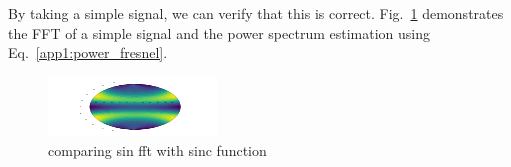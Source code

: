 By taking a simple signal, we can verify that this is correct. Fig.~\ref{app1:sinderivative:fresnel} demonstrates the \gls{FFT} of a simple signal and the power spectrum estimation using Eq.~\ref{app1:power_fresnel}.

\begin{figure}
	\centering
	\includegraphics[width=\linewidth]{testimg.png}
	\caption[Comparison of power spectrum simulation with \gls{FFT} of sinusoid with frequency derivative.]{comparing sin fft with sinc function}
	\label{app1:sinderivative:fresnel}
\end{figure}

